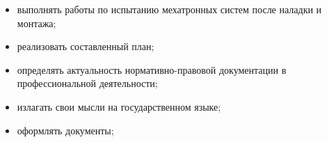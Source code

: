 \begin{itemize}
    \item выполнять работы по испытанию мехатронных систем после наладки и монтажа;
    \item реализовать составленный план;
    \item определять актуальность нормативно-правовой документации в профессиональной деятельности;
    \item излагать свои мысли на государственном языке;
    \item оформлять документы;

\end{itemize}
